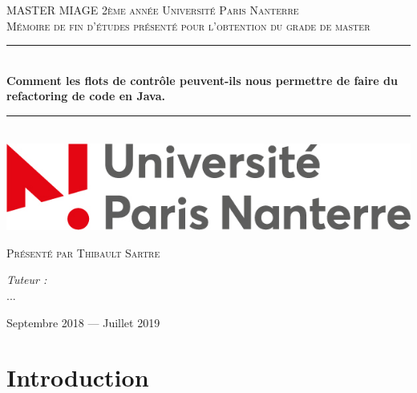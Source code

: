 \documentclass[a4paper,twoside,12pt,openright]{report}
\newcommand{\HRule}{\rule{\linewidth}{0.5mm}}
\begin{document}
\begin{titlepage}
  \begin{sffamily}
  \begin{center}

    \textsc{\LARGE MASTER MIAGE 2ème année \linebreak Université Paris Nanterre}\\[2cm]

    \textsc{\Large Mémoire de fin d’études présenté pour l’obtention du grade de master}\\[1.5cm]

    \HRule \\[0.4cm]
    { \huge \bfseries Comment les flots de contrôle peuvent-ils nous permettre de faire du refactoring de code en Java. \\[0.4cm] }

    \HRule \\[2cm]
    \includegraphics[scale=0.40]{univ.jpg}
    \hspace{2cm}
    
    \vfill
  \begin{minipage}{0.4\textwidth}
      \begin{flushleft} \large
        \textsc{Présenté par Thibault Sartre}\\
      \end{flushleft}
    \end{minipage}
    \begin{minipage}{0.4\textwidth}
      \begin{flushright} \large
        \emph{Tuteur :}\\ \textsc{...}\\
      \end{flushright}
    \end{minipage}
    \vfill
    {\large Septembre 2018 — Juillet 2019}
  \end{center}
  \end{sffamily}
\end{titlepage}
\renewcommand{\contentsname}{Sommaire}
\tableofcontents{}
\chapter{Introduction}
\end{document}

